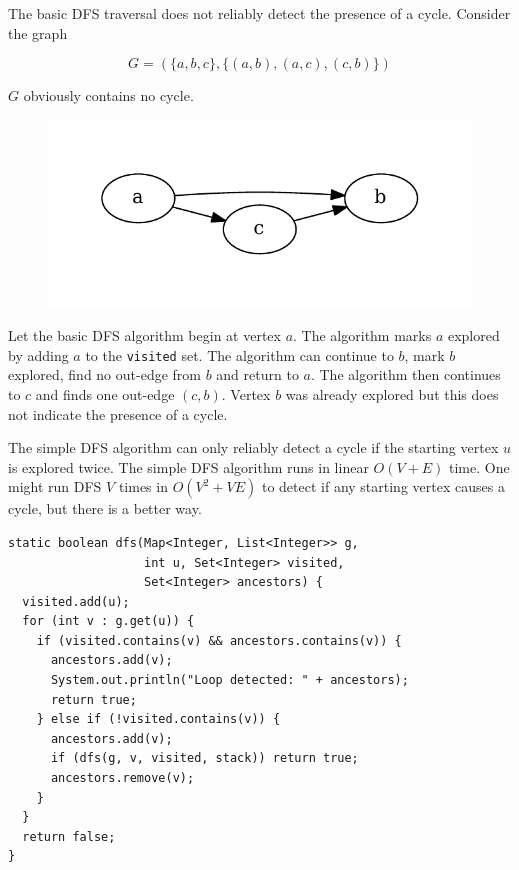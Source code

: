 \documentclass{book}
\begin{document}
The basic DFS traversal does not reliably detect the presence of a cycle. Consider the graph

\begin{equation*}
G = ( \{a,b,c\}, \{ (a,b), (a,c), (c,b) \} )
\end{equation*}

$G$ obviously contains no cycle.

\begin{figure}[H]
\centering
\includegraphics{ch-dag/abc_dag}
\label{abc_dag}
\end{figure}

Let the basic DFS algorithm begin at vertex $a$. The algorithm marks $a$ explored by adding $a$ to the \texttt{visited} set. The algorithm can continue to $b$, mark $b$ explored, find no out-edge from $b$ and return to $a$. The algorithm then continues to $c$ and finds one out-edge $(c,b)$. Vertex $b$ was already explored but this does not indicate the presence of a cycle.

The simple DFS algorithm can only reliably detect a cycle if the starting vertex $u$ is explored twice. The simple DFS algorithm runs in linear $O(V+E)$ time. One might run DFS $V$ times in $O(V^2+VE)$ to detect if any starting vertex causes a cycle, but there is a better way.

\begin{lstlisting}[columns=fixed,caption={A modified two-color DFS algorithm},label={2colormod}]
static boolean dfs(Map<Integer, List<Integer>> g,
                   int u, Set<Integer> visited,
                   Set<Integer> ancestors) {
  visited.add(u);
  for (int v : g.get(u)) {
    if (visited.contains(v) && ancestors.contains(v)) {
      ancestors.add(v);
      System.out.println("Loop detected: " + ancestors);
      return true;
    } else if (!visited.contains(v)) {
      ancestors.add(v);
      if (dfs(g, v, visited, stack)) return true;
      ancestors.remove(v);
    }
  }
  return false;
}
\end{lstlisting}
\end{document}
